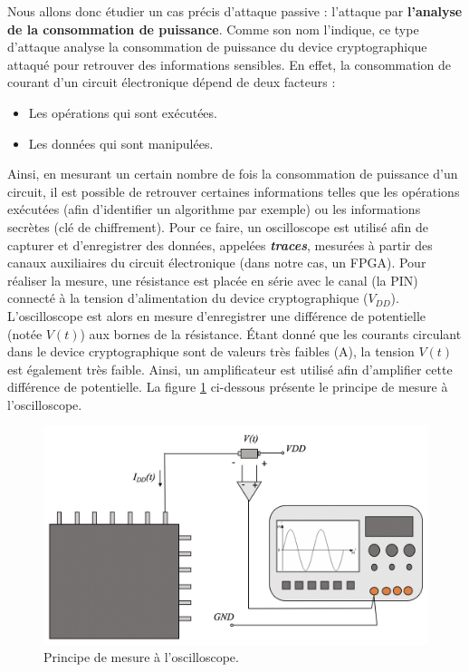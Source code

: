 \documentclass[oneside]{book}
\begin{document}
Nous allons donc étudier un cas précis d'attaque passive : l'attaque par \textbf{l'analyse de la consommation de puissance}. Comme son nom l'indique, ce type d'attaque analyse la consommation de puissance du device cryptographique attaqué pour retrouver des informations sensibles. En effet, la consommation de courant d'un circuit électronique dépend de deux facteurs : 
\begin{itemize}
\item Les opérations qui sont exécutées.
\item Les données qui sont manipulées.
\end{itemize}
Ainsi, en mesurant un certain nombre de fois la consommation de puissance d'un circuit, il est possible de retrouver certaines informations telles que les opérations exécutées (afin d'identifier un algorithme par exemple) ou les informations secrètes (clé de chiffrement). Pour ce faire, un oscilloscope est utilisé afin de capturer et d'enregistrer des données, appelées \textbf{\textit{traces}}, mesurées à partir des canaux auxiliaires du circuit électronique (dans notre cas, un FPGA). Pour réaliser la mesure, une résistance est placée en série avec le canal (la PIN) connecté à la tension d'alimentation du device cryptographique ($V_{DD}$). L'oscilloscope est alors en mesure d'enregistrer une différence de potentielle (notée $V(t)$) aux bornes de la résistance. Étant donné que les courants circulant dans le device cryptographique sont de valeurs très faibles (\si{\micro}A), la tension $V(t)$ est également très faible. Ainsi, un amplificateur est utilisé afin d'amplifier cette différence de potentielle. La figure \ref{fig:oscillo} ci-dessous présente le principe de mesure à l'oscilloscope.
\begin{figure}[htbp]
    \centering
    \includegraphics[scale=0.4]{image/oscillo}
    \caption{Principe de mesure à l'oscilloscope.}
    \label{fig:oscillo} 
\end{figure}
\end{document}
